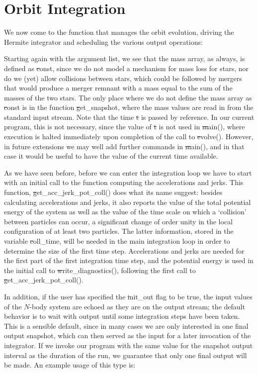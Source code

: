 \section{Orbit Integration}

We now come to the function that manages the orbit evolution, driving
the Hermite integrator and scheduling the various output operations:


Starting again with the argument list, we see that the mass array, as
always, is defined as {\st const}, since we do not model a mechanism
for mass loss for stars, nor do we (yet) allow collisions between
stars, which could be followed by mergers that would produce a merger
remnant with a mass equal to the sum of the masses of the two stars.
The only place where we do not define the mass array as {\st const} is
in the function {\st get\_snapshot}, where the mass values are read in
from the standard input stream.  Note that the time {\st t} is passed
by reference.  In our current program, this is not necessary, since
the value of {\st t} is not used in {\st main()}, where execution is
halted immediately upon completion of the call to {\st evolve()}.
However, in future extensions we may well add further commands in {\st
main()}, and in that case it would be useful to have the value of the
current time available.

As we have seen before, before we can enter the integration loop we
have to start with an initial call to the function computing the
accelerations and jerks.  This function, {\st get\_acc\_jerk\_pot\_coll()}
does what its name suggest: besides calculating accelerations and jerks,
it also reports the value of the total potential energy of the system
as well as the value of the time scale on which a `collision' between
particles can occur, \ie a significant change of order unity in the
local configuration of at least two particles.  The latter information,
stored in the variable {\st coll\_time}, will be needed in the main
integration loop in order to determine the size of the first time step.
Accelerations and jerks are needed for the first part of the first
integration time step, and the potential energy is used in the initial
call to {\st write\_diagnostics()}, following the first call to
{\st get\_acc\_jerk\_pot\_coll()}.

In addition, if the user has specified the {\st init\_out} flag to be
true, the input values of the $N$-body system are echoed as they are
on the output stream; the default behavior is to wait with output until
some integration steps have been taken.  This is a sensible default,
since in many cases we are only interested in one final output snapshot,
which can then served as the input for a later invocation of the
integrator.  If we invoke our program with the same value for the
snapshot output interval as the duration of the run, we guarantee that
only one final output will be made.  An example usage of this type is:

